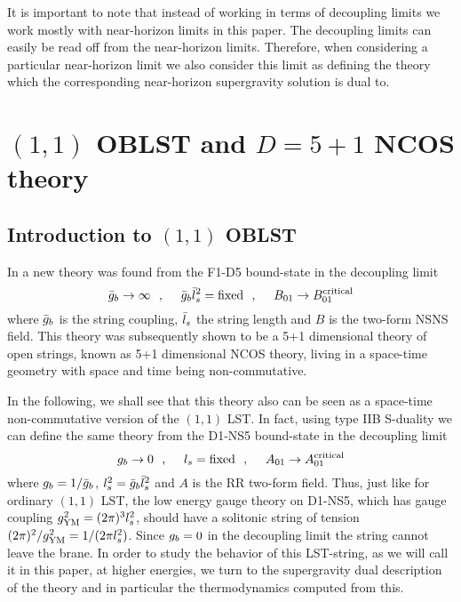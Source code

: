 \documentclass[a4paper,twoside,titlepage,12pt]{article}
\begin{document}
It is important to note that instead 
of working in terms of decoupling limits we work mostly with
near-horizon limits in this paper. 
The decoupling limits can easily be read off from the 
near-horizon limits.
Therefore, when considering a particular near-horizon limit
we also consider this limit as defining the theory 
which the corresponding near-horizon supergravity solution
is dual to.





\section{$(1,1)$ OBLST and $D=5+1$ NCOS theory}
\label{secOBLST11}

\subsection{Introduction to $(1,1)$ OBLST}

In \cite{Gopakumar:2000na} a new theory was found from the F1-D5 bound-state 
in the decoupling limit
%
\begin{equation}
\bar{g}_b \rightarrow \infty \ \ ,\ \ \ \ 
\bar{g}_b \bar{l}_s^2 = \mbox{fixed} \ \ ,\ \ \ \ 
B_{01} \rightarrow B_{01}^{\rm critical}
\end{equation}
%
where $\bar{g}_b$ is the string coupling, $\bar{l}_s$ the string length and
$B$ is the two-form NSNS field.
This theory was subsequently shown to be a 
5+1 dimensional theory of open strings, known as 5+1 dimensional NCOS theory, 
living in a space-time geometry with space and time being non-commutative. 

In the following, we shall see that this theory also can be seen as a
space-time non-commutative version of the $(1,1)$ LST.
In fact, using type IIB S-duality we can define the same theory from 
the D1-NS5 bound-state in the decoupling limit 
%
\begin{equation}
g_b \rightarrow 0 \ \ ,\ \ \ \  
l_s = \mbox{fixed} \ \ ,\ \ \ \ 
A_{01} \rightarrow A_{01}^{\rm critical}
\end{equation}
%
where \( g_b = 1 / \bar{g}_b \), \( l_s^2 = \bar{g}_b \bar{l}_s^2 \) 
and $A$ is the RR two-form field.
Thus, just like for ordinary $(1,1)$ LST, the low energy gauge theory
on D1-NS5, which has gauge coupling $g_{\mathrm{YM}}^2 = (2\pi)^3 l_s^2$, should have 
a solitonic string of tension $(2\pi)^2 / g_{\mathrm{YM}}^2 = 1 / (2\pi l_s^2) $. 
Since \( g_b = 0 \) in the decoupling limit the string cannot leave the
brane.
In order to study the behavior 
of this LST-string, as we will call it in this paper,
at higher energies, we turn to the supergravity dual description of the
theory and in particular the thermodynamics computed from this. 
\end{document}
